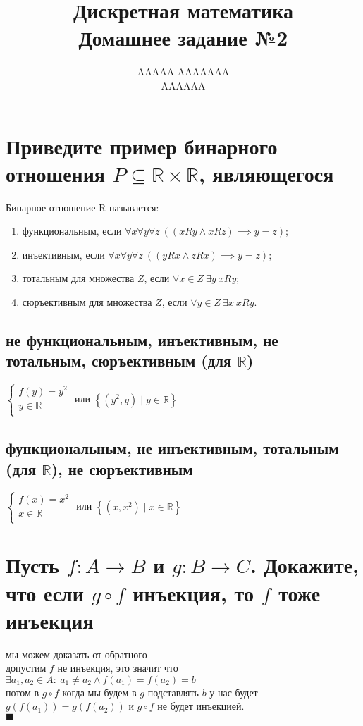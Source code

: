 \documentclass{article}
\title{Дискретная математика \\ Домашнее задание №2}
\author{AAAAA AAAAAAA \\ AAAAAA}
\newcommand{\R}{\mathbb{R}}
\renewcommand{\l}{\left}
\renewcommand{\r}{\right}
\begin{document}
  \maketitle

  \section{Приведите пример бинарного отношения $P \subseteq \R \times \R$, являющегося}
  Бинарное отношение R называется: %
  \begin{enumerate}
    \item функциональным, если $\forall x\forall y\forall z\ ((xRy \land xRz) \implies y = z)$;
    \item инъективным, если $\forall x\forall y\forall z\ ((yRx \land zRx) \implies y = z)$;
    \item тотальным для множества $Z$, если $\forall x \in Z\ \exists y\ xRy$;
    \item сюръективным для множества $Z$, если $\forall y \in Z\ \exists x\ xRy$.
  \end{enumerate}
  \subsection{не функциональным, инъективным, не тотальным, сюръективным (для $\R$)}
  $\begin{cases}
    f(y) = y^2 \\
    y \in \R \\
  \end{cases}$ или $ \l\{(y^2, y) \mid y \in \R\r\}$
  \subsection{функциональным, не инъективным, тотальным (для $\R$), не сюръективным}
  $\begin{cases}
    f(x) = x^2 \\
    x \in \R \\
  \end{cases}$ или $ \l\{(x, x^2) \mid x \in \R\r\}$

  \section{Пусть $f : A \to B$ и $g : B \to C$. Докажите, что если $g \circ f$ инъекция, то $f$ тоже инъекция}
  мы можем доказать от обратного \\
  допустим $f$ не инъекция, это значит что $\exists a_1,a_2\in A:\ a_1\neq a_2 \land f(a_1)=f(a_2)=b $ \\
  потом в $g \circ f$ когда мы будем в $g$ подставлять $b$ у нас будет $g\l(f\l(a_1\r)\r) = g\l(f\l(a_2\r)\r)$
  и $g \circ f$ не будет инъекцией. \\
  $\blacksquare$
\end{document}
